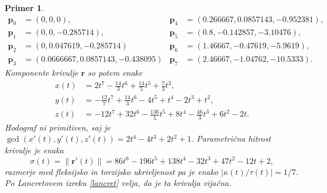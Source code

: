 \documentclass[12pt,a4paper,twoside]{article}
\theoremstyle{definition} %
\theoremstyle{plain} %
\theoremstyle{primerstyle}
\newtheorem{primer}[definicija]{Primer}
\numberwithin{equation}{section}  %
\newcommand{\pV}{\mathbf{p}}
\newcommand{\rV}{\mathbf{r}}
\begin{document}
\begin{primer}
	\begin{align*}
		\pV_0&=(0,0,0),&\pV_4&=(0.266667, 0.0857143, -0.952381),\\
		\pV_1&=(0, 0, -0.285714),&\pV_5&=(0.8, -0.142857, -3.10476),\\
		\pV_2&=(0, 0.047619, -0.285714)&\pV_6&=(1.46667, -0.47619, -5.9619),\\
		\pV_3&=(0.0666667, 0.0857143, -0.438095)&\pV_7&=(2.46667, -1.04762, -10.5333).
	\end{align*}
	Komponente krivulje $\rV$ so potem enake
	\begin{align*}
		x(t)&=2t^7-\frac{14}{3}t^6+\frac{14}{5}t^5+\frac{7}{3}t^3,\\
		y(t)&=-\frac{12}{7}t^7+\frac{14}{3}t^6-4t^5+t^4-2t^3+t^2,\\
		z(t)&=-12t^7+32t^6-\frac{136}{5}t^5+8t^4-\frac{46}{3}t^3+6t^2-2t.
	\end{align*}
	Hodograf ni primitiven, saj je $\gcd(x'(t),y'(t),z'(t))=2t^4-4t^3+2t^2+1.$ Parametrična hitrost krivulje je enaka
	\begin{equation*}
		\sigma(t)=\lVert\rV'(t)\rVert=86t^6-196t^5+138t^4-32t^3+47t^2-12t+2,
	\end{equation*}
	razmerje med fleksijsko in torzijsko ukrivljenost pa je enako $|\kappa(t)/\tau(t)|=1/7.$ Po Lancretovem izreku \ref{lancret} velja, da je ta krivulja vijačna.
\end{primer}
\end{document}
